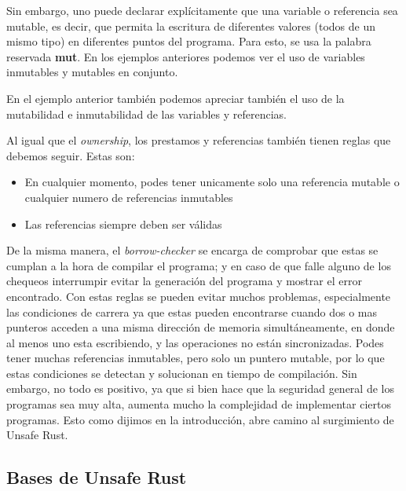 Sin embargo, uno puede declarar explícitamente que una variable o referencia sea mutable, es decir, que permita la escritura de diferentes valores (todos de un mismo tipo) en diferentes puntos del programa. Para esto, se usa la palabra reservada \textbf{mut}. En los ejemplos anteriores podemos ver el uso de variables inmutables y mutables en conjunto.

En el ejemplo anterior también podemos apreciar también el uso de la mutabilidad e inmutabilidad de las variables y referencias.

Al igual que el \textit{ownership}, los prestamos y referencias también tienen reglas que debemos seguir. Estas son:
\begin{itemize}
  \item En cualquier momento, podes tener unicamente solo una referencia mutable o cualquier numero de referencias inmutables
  \item Las referencias siempre deben ser válidas
\end{itemize}

De la misma manera, el \textit{borrow-checker} se encarga de comprobar que estas se cumplan a la hora de compilar el programa; y en caso de que falle alguno de los chequeos interrumpir evitar la generación del programa y mostrar el error encontrado. Con estas reglas se pueden evitar muchos problemas, especialmente las condiciones de carrera ya que estas pueden encontrarse cuando dos o mas punteros acceden a una misma dirección de memoria simultáneamente, en donde al menos uno esta escribiendo, y las operaciones no están sincronizadas. Podes tener muchas referencias inmutables, pero solo un puntero mutable, por lo que estas condiciones se detectan y solucionan en tiempo de compilación.
Sin embargo, no todo es positivo, ya que si bien hace que la seguridad general de los programas sea muy alta, aumenta mucho la complejidad de implementar ciertos programas. Esto como dijimos en la introducción, abre camino al surgimiento de Unsafe Rust.

\subsection{Bases de Unsafe Rust}

